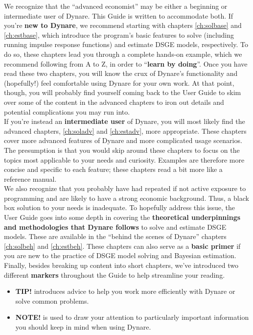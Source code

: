 \documentclass[cn,10pt,math=newtx,citestyle=gb7714-2015,bibstyle=gb7714-2015]{elegantbook}
\begin{document}
	We recognize that the ``advanced economist'' may be either a beginning or intermediate user of Dynare. This Guide is written to accommodate both. If you're \textbf{new to Dynare}, we recommend starting with chapters \ref{ch:solbase} and \ref{ch:estbase}, which introduce the program's basic features to solve (including running impulse response functions) and estimate DSGE models, respectively. To do so, these chapters lead you through a complete hands-on example, which we recommend following from A to Z, in order to ``\textbf{learn by doing}''. Once you have read these two chapters, you will know the crux of Dynare's functionality and (hopefully!) feel comfortable using Dynare for your own work. At that point, though, you will probably find yourself coming back to the User Guide to skim over some of the content in the advanced chapters to iron out details and potential complications you may run into.\\
	
	If you're instead an \textbf{intermediate user} of Dynare, you will most likely find the advanced chapters, \ref{ch:soladv} and \ref{ch:estadv}, more appropriate. These chapters cover more advanced features of Dynare and more complicated usage scenarios. The presumption is that you would skip around these chapters to focus on the topics most applicable to your needs and curiosity. Examples are therefore more concise and specific to each feature; these chapters read a bit more like a reference manual.\\
	
	We also recognize that you probably have had repeated if not active exposure to programming and are likely to have a strong economic background. Thus, a black box solution to your needs is inadequate. To hopefully address this issue, the User Guide goes into some depth in covering the \textbf{theoretical underpinnings and methodologies that Dynare follows} to solve and estimate DSGE models. These are available in the ``behind the scenes of Dynare'' chapters \ref{ch:solbeh} and \ref{ch:estbeh}. These chapters can also serve as a \textbf{basic primer} if you are new to the practice of DSGE model solving and Bayesian estimation. \\
	
	Finally, besides breaking up content into short chapters, we've introduced two different \textbf{markers} throughout the Guide to help streamline your reading.
	\begin{itemize}
		\item \textbf{\textsf{TIP!}} introduces advice to help you work more efficiently with Dynare or solve common problems.
		\item \textbf{\textsf{NOTE!}} is used to draw your attention to particularly important information you should keep in mind when using Dynare.
	\end{itemize}
	
\end{document}
